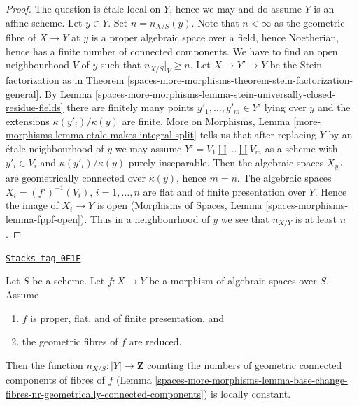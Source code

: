 \begin{proof}
The question is \'etale local on $Y$, hence we may and do assume $Y$
is an affine scheme. Let $y \in Y$. Set $n = n_{X/S}(y)$.
Note that $n < \infty$ as the geometric fibre of $X \to Y$ at $y$
is a proper algebraic space over a field, hence Noetherian, hence
has a finite number of connected components.
We have to find an open neighbourhood $V$ of $y$ such that $n_{X/S}|_V \geq n$.
Let $X \to Y' \to Y$ be the Stein factorization as in
Theorem \ref{spaces-more-morphisms-theorem-stein-factorization-general}.
By Lemma \ref{spaces-more-morphisms-lemma-stein-universally-closed-residue-fields}
there are finitely many points
$y'_1, \ldots, y'_m \in Y'$ lying over $y$
and the extensions $\kappa(y'_i)/\kappa(y)$ are finite.
More on Morphisms, Lemma \ref{more-morphisms-lemma-etale-makes-integral-split}
tells us that after replacing $Y$ by an \'etale neighbourhood
of $y$ we may assume $Y' = V_1 \amalg \ldots \amalg V_m$ as a scheme
with $y'_i \in V_i$ and $\kappa(y'_i)/\kappa(y)$ purely inseparable.
Then the algebraic spaces $X_{y_i'}$ are geometrically connected over
$\kappa(y)$, hence $m = n$. The algebraic spaces
$X_i = (f')^{-1}(V_i)$, $i = 1, \ldots, n$
are flat and of finite presentation over $Y$. Hence the image of $X_i \to Y$
is open (Morphisms of Spaces, Lemma \ref{spaces-morphisms-lemma-fppf-open}).
Thus in a neighbourhood of $y$ we see that $n_{X/Y}$ is
at least $n$.
\end{proof}

\begin{lemma}
\label{spaces-more-morphisms-lemma-proper-flat-geom-red}
\href{https://stacks.math.columbia.edu/tag/0E1E}{\texttt{Stacks tag 0E1E}}

Let $S$ be a scheme.
Let $f : X \to Y$ be a morphism of algebraic spaces over $S$. Assume
\begin{enumerate}
\item $f$ is proper, flat, and of finite presentation, and
\item the geometric fibres of $f$ are reduced.
\end{enumerate}
Then the function $n_{X/S} : |Y| \to \mathbf{Z}$
counting the numbers of geometric connected components
of fibres of $f$
(Lemma \ref{spaces-more-morphisms-lemma-base-change-fibres-nr-geometrically-connected-components})
is locally constant.
\end{lemma}


